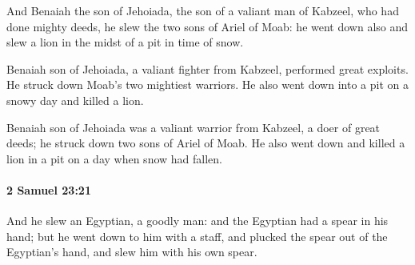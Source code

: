 			\begin{versebox}
					\item[BHS] 
					\item[ASV] And Benaiah the son of Jehoiada, the son of a valiant man of Kabzeel, who had done mighty deeds, he slew the two sons of Ariel of Moab: he went down also and slew a lion in the midst of a pit in time of snow.
					\item[NIV] Benaiah son of Jehoiada, a valiant fighter from Kabzeel, performed great exploits. He struck down Moab’s two mightiest warriors. He also went down into a pit on a snowy day and killed a lion.
					\item[NRSV] Benaiah son of Jehoiada was a valiant warrior from Kabzeel, a doer of great deeds; he struck down two sons of Ariel of Moab. He also went down and killed a lion in a pit on a day when snow had fallen.
			\end{versebox}

		\paragraph{2 Samuel 23:21} %
			\label{2SAMUEL-23-21}

			And he slew an Egyptian, a goodly man: and the Egyptian had a spear in his hand; but he went down to him with a staff, and plucked the spear out of the Egyptian’s hand, and slew him with his own spear.


